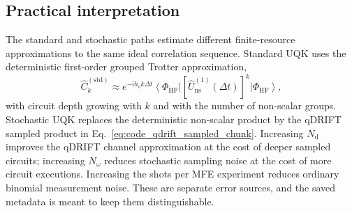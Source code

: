 \documentclass[11pt]{article}
\newcommand{\ii}{\mathrm{i}}
\newcommand{\ket}[1]{\left|#1\right\rangle}
\newcommand{\bra}[1]{\left\langle#1\right|}
\begin{document}
\subsection{Practical interpretation}

The standard and stochastic paths estimate different finite-resource approximations to the same ideal correlation sequence.  Standard UQK uses the deterministic first-order grouped Trotter approximation,
\begin{equation}
    \widehat{C}^{\mathrm{(std)}}_k
    \approx
    e^{-\ii h_o k\Delta t}
    \bra{\Phi_{\mathrm{HF}}}
    \left[\hat{U}^{(1)}_{\mathrm{ns}}(\Delta t)\right]^k
    \ket{\Phi_{\mathrm{HF}}},
\end{equation}
with circuit depth growing with $k$ and with the number of non-scalar groups.  Stochastic UQK replaces the deterministic non-scalar product by the qDRIFT sampled product in Eq.~\eqref{eq:code_qdrift_sampled_chunk}.  Increasing $N_{\mathrm{d}}$ improves the qDRIFT channel approximation at the cost of deeper sampled circuits; increasing $N_\omega$ reduces stochastic sampling noise at the cost of more circuit executions.  Increasing the shots per MFE experiment reduces ordinary binomial measurement noise.  These are separate error sources, and the saved metadata is meant to keep them distinguishable.
\end{document}
